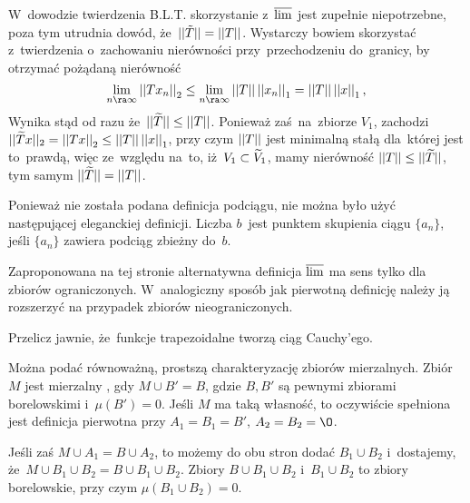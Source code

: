 \documentclass[a4paper,11pt]{article}
\begin{document}
\start {} W~dowodzie twierdzenia B.L.T. skorzystanie z~$\overline{\lim}$
jest zupełnie niepotrzebne, poza tym utrudnia dowód,
że~$|| \tilde{ T } || = \left|\left|  T  \right|\right|$. Wystarczy bowiem skorzystać
z~twierdzenia o~zachowaniu nierówności przy~przechodzeniu do~granicy,
by otrzymać pożądaną nierówność
\begin{equation*}
  \Lim_{ n \ra \infty } \norm{ T x_{ n } }_{ 2 }
  \leq \Lim_{ n \ra \infty } \norm{ T } \norm{ x_{ n } }_{ 1 }
  = \norm{ T } \norm{ x }_{ 1 },
\end{equation*}
Wynika stąd od razu że~$|| \widetilde{ T } || \leq \left|\left|  T  \right|\right|$. Ponieważ
zaś~na~zbiorze $V_{ 1 }$, zachodzi
$|| \widetilde{ T } x ||_{ 2 } = \left|\left|  T x  \right|\right|_{ 2 } \leq \left|\left|  T  \right|\right| \left|\left|  x
 \right|\right|_{ 1 }$, przy czym $\left|\left|  T  \right|\right|$ jest minimalną stałą dla~której jest
to~prawdą, więc ze~względu na~to, iż~$V_{ 1 } \subset \widetilde{ V }_{ 1 }$,
mamy nierówność $\left|\left|  T  \right|\right| \leq || \widetilde{ T } ||$, tym samym
$|| \widetilde{ T } || = \left|\left|  T  \right|\right|$. %

\vspace{\spaceFour}


\start {} Ponieważ nie została podana definicja podciągu, nie
można było użyć następującej eleganckiej definicji. Liczba $b$~jest
punktem skupienia ciągu $\{ a_{ n } \}$, jeśli $\{ a_{ n } \}$ zawiera
podciąg zbieżny do~$b$. %

\vspace{\spaceFour}


\start {} Zaproponowana na tej stronie alternatywna definicja
$\overline{\lim}$ ma sens tylko dla zbiorów ograniczonych. W~analogiczny
sposób jak pierwotną definicję należy ją rozszerzyć na przypadek
zbiorów nieograniczonych. %

\vspace{\spaceFour}


\start {} Przelicz jawnie, że~funkcje trapezoidalne tworzą ciąg
Cauchy'ego. \Dok

\vspace{\spaceFour}


\start {} Można podać równoważną, prostszą charakteryzację
zbiorów mierzalnych. Zbiór $M$ jest mierzalny \wtw, gdy
$M \cup B' = B$, gdzie $B, B'$ są pewnymi zbiorami borelowskimi
i~$\mu( B' ) = 0$. Jeśli $M$ ma taką własność, to oczywiście spełniona
jest definicja pierwotna przy $A_{ 1 } = B_{ 1 } = B'$,
$A_{ 2 } = B_{ 2 } = \O$.

Jeśli zaś $M \cup A_{ 1 } = B \cup A_{ 2 }$, to możemy do obu stron
dodać $B_{ 1 } \cup B_{ 2 }$ i~dostajemy,
że~$M \cup B_{ 1 } \cup B_{ 2 } = B \cup B_{ 1 } \cup B_{ 2 }$. Zbiory
$B \cup B_{ 1 } \cup B_{ 2 }$ i~$B_{ 1 } \cup B_{ 2 }$ to zbiory
borelowskie, przy czym $\mu( B_{ 1 } \cup B_{ 2 } ) = 0$.
\end{document}
